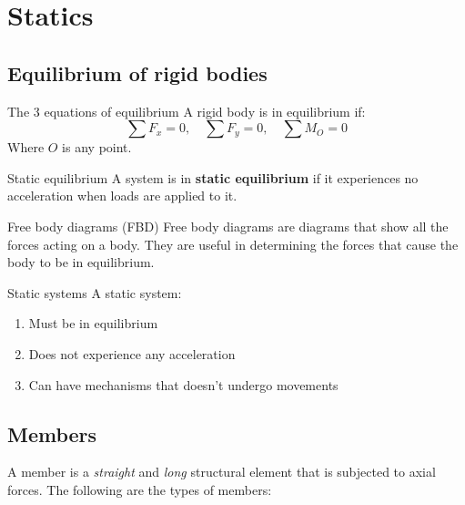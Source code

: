 
\section{Statics}
\subsection{Equilibrium of rigid bodies}
\begin{definition}
    {The 3 equations of equilibrium}
    A rigid body is in equilibrium if:
    \[\sum F_x=0,\quad\sum F_y=0,\quad\sum M_O=0\]
    Where $O$ is any point.
\end{definition}
\begin{definition}
    {Static equilibrium}
    A system is in \textbf{static equilibrium} if it experiences no acceleration when loads are applied to it.
\end{definition}
\begin{knBox}
    {Free body diagrams (FBD)}
    Free body diagrams are diagrams that show all the forces acting on a body. They are useful in determining the forces that cause the body to be in equilibrium.
\end{knBox}
\begin{definition}
    {Static systems}
    A static system:
    \begin{enumerate}
        \item Must be in equilibrium
        \item Does not experience any acceleration
        \item Can have mechanisms that doesn't undergo movements
    \end{enumerate}
\end{definition}

\subsection{Members}
A member is a \emph{straight} and \emph{long} structural element that is subjected to axial forces. The following are the types of members:


